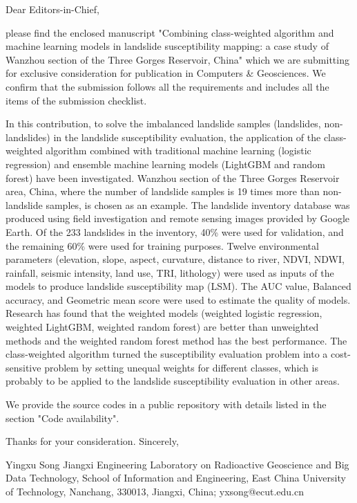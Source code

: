 \documentclass[a4paper,fleqn]{cas-sc}
\begin{document}
\begin{coverletter}

Dear Editors-in-Chief,
\newline

please find the enclosed manuscript "Combining class-weighted algorithm and machine learning models in landslide susceptibility mapping: a case study of Wanzhou section of the Three Gorges Reservoir, China" which we are submitting for exclusive consideration for publication in Computers \& Geosciences. 
We confirm that the submission follows all the requirements and includes all the items of the submission checklist.  
\newline

In this contribution, to solve the imbalanced landslide samples (landslides, non-landslides) in the landslide susceptibility evaluation, the application of the class-weighted algorithm combined with traditional machine learning (logistic regression) and ensemble machine learning models (LightGBM and random forest) have been investigated. 
Wanzhou section of the Three Gorges Reservoir area, China, where the number of landslide samples is 19 times more than non-landslide samples, is chosen as an example. 
The landslide inventory database was produced using field investigation and remote sensing images provided by Google Earth. 
Of the 233 landslides in the inventory, 40\% were used for validation, and the remaining 60\% were used for training purposes. Twelve environmental parameters (elevation, slope, aspect, curvature, distance to river, NDVI, NDWI, rainfall, seismic intensity, land use, TRI, lithology) were used as inputs of the models to produce landslide susceptibility map (LSM). 
The AUC value, Balanced accuracy, and Geometric mean score were used to estimate the quality of models. 
Research has found that the weighted models (weighted logistic regression, weighted LightGBM, weighted random forest) are better than unweighted methods and the weighted random forest method has the best performance. 
The class-weighted algorithm turned the susceptibility evaluation problem into a cost-sensitive problem by setting unequal weights for different classes, which is probably to be applied to the landslide susceptibility evaluation in other areas.
\newline

We provide the source codes in a public repository with details listed in the section "Code availability".
\newline

Thanks for your consideration. 
\newline
Sincerely,
\newline

Yingxu Song
\newline
Jiangxi Engineering Laboratory on Radioactive Geoscience and Big Data Technology, School of Information and Engineering, East China University of Technology, Nanchang, 330013, Jiangxi, China; yxsong@ecut.edu.cn
\end{coverletter}
\end{document}
